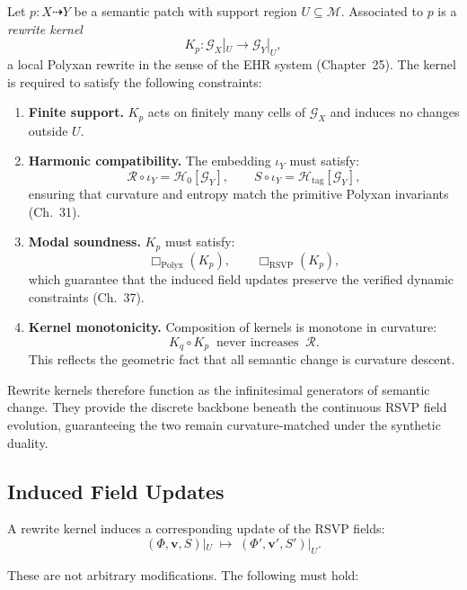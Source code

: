 Let $p : X \dasharrow Y$ be a semantic patch with support region $U \subseteq \mathcal{M}$.
Associated to $p$ is a \emph{rewrite kernel}
\[
K_p : \mathcal{G}_X|_U \longrightarrow \mathcal{G}_Y|_U,
\]
a local Polyxan rewrite in the sense of the EHR system (Chapter~25).
The kernel is required to satisfy the following constraints:

\begin{enumerate}
\item \textbf{Finite support.}  
      $K_p$ acts on finitely many cells of $\mathcal{G}_X$ and induces no changes outside $U$.

\item \textbf{Harmonic compatibility.}  
      The embedding $\iota_Y$ must satisfy:
      \[
      \mathcal{R} \circ \iota_Y = \mathcal{H}_0[\mathcal{G}_Y], 
      \qquad
      S\circ \iota_Y = \mathcal{H}_{\mathrm{tag}}[\mathcal{G}_Y],
      \]
      ensuring that curvature and entropy match the primitive Polyxan invariants (Ch.~31).

\item \textbf{Modal soundness.}  
      $K_p$ must satisfy:
      \[
      \Box_{\mathrm{Polyx}}(K_p),
      \qquad
      \Box_{\mathrm{RSVP}}(K_p),
      \]
      which guarantee that the induced field updates preserve the verified dynamic constraints (Ch.~37).

\item \textbf{Kernel monotonicity.}  
      Composition of kernels is monotone in curvature:
      \[
      K_q \circ K_p \;\;\text{never increases}\;\; \mathcal{R}.
      \]
      This reflects the geometric fact that all semantic change is curvature descent.
\end{enumerate}

Rewrite kernels therefore function as the infinitesimal generators
of semantic change.  
They provide the discrete backbone beneath the continuous
RSVP field evolution, guaranteeing the two remain curvature-matched under the synthetic duality.

\subsection{Induced Field Updates}
\label{subsec:79-2-field-updates}

A rewrite kernel induces a corresponding update of the RSVP fields:
\[
(\Phi,\mathbf{v},S)|_U \;\longmapsto\; (\Phi',\mathbf{v}',S')|_U.
\]

These are not arbitrary modifications.  
The following must hold:

